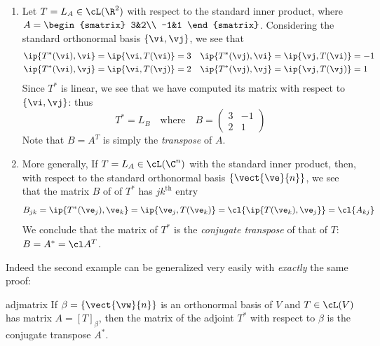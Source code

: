 \begin{examples}
\begin{enumerate}
  \item Let $T=L_A\in\cL(\R^2)$ with respect to the standard inner product, where $A=\begin{smatrix}
  3&2\\
  -1&1
  \end{smatrix}$. Considering the standard orthonormal basis $\{\vi,\vj\}$, we see that
  \begin{align*}
  &\ip{T^*(\vi),\vi}=\ip{\vi,T(\vi)}=3 &&\ip{T^*(\vj),\vi}=\ip{\vj,T(\vi)}=-1\\
  &\ip{T^*(\vi),\vj}=\ip{\vi,T(\vj)}=2 &&\ip{T^*(\vj),\vj}=\ip{\vj,T(\vj)}=1
  \end{align*}
  Since $T^*$ is linear, we see that we have computed its matrix with respect to $\{\vi,\vj\}$: thus
  \[T^*=L_B\quad\text{where}\quad B=\begin{pmatrix}
  3&-1\\
  2&1
  \end{pmatrix}\]
  Note that $B=A^T$ is simply the \emph{transpose} of $A$.
  
  \item More generally, If $T=L_A\in\cL(\C^n)$ with the standard inner product, then, with respect to the standard orthonormal basis $\{\vect{\ve}{n}\}$, we see that the matrix $B$ of of $T^*$ has $jk^\text{th}$ entry
  \[B_{jk}=\ip{T^*(\ve_j),\ve_k} =\ip{\ve_j,T(\ve_k)} =\cl{\ip{T(\ve_k),\ve_j}} =\cl{A_{kj}}\]
	We conclude that the matrix of $T^*$ is the \emph{conjugate transpose} of that of $T$: $B=A^*=\cl A^T$.
\end{enumerate}
\end{examples}

Indeed the second example can be generalized very easily with \emph{exactly} the same proof:

\begin{lemm}{}{adjmatrix}
If $\beta=\{\vect{\vw}{n}\}$ is an orthonormal basis of $V$ and $T\in\cL(V)$ has matrix $A=[T]_\beta$, then the matrix of the adjoint $T^*$ with respect to $\beta$ is the conjugate transpose $A^*$.
\end{lemm}

